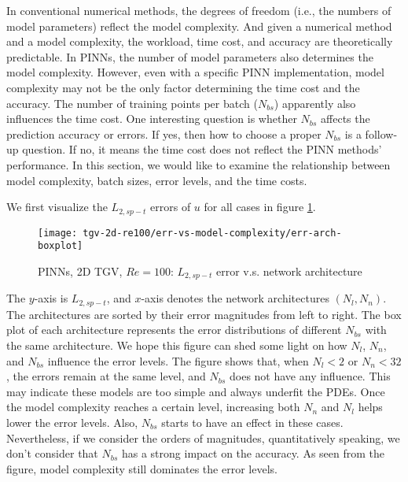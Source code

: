 
In conventional numerical methods, the degrees of freedom (i.e., the numbers of model parameters) reflect the model complexity.
And given a numerical method and a model complexity, the workload, time cost, and accuracy are theoretically predictable.
In PINNs, the number of model parameters also determines the model complexity.
However, even with a specific PINN implementation, model complexity may not be the only factor determining the time cost and the accuracy.
The number of training points per batch ($N_{bs}$) apparently also influences the time cost.
One interesting question is whether $N_{bs}$ affects the prediction accuracy or errors.
If yes, then how to choose a proper $N_{bs}$ is a follow-up question. 
If no, it means the time cost does not reflect the PINN methods' performance.
In this section, we would like to examine the relationship between model complexity, batch sizes, error levels, and the time costs.

We first visualize the $L_{2,sp-t}$ errors of $u$ for all cases in figure \ref{fig:tgv2d-re100-err-vs-arch}.
\begin{figure}[hbt!]
    \centering%
    \texttt{[image: tgv-2d-re100/err-vs-model-complexity/err-arch-boxplot]}
    \caption[%
        PINNs, 2D TGV, $Re=100$: $L_{2,sp-t}$ error v.s. network architecture%
    ]{%
        PINNs, 2D TGV, $Re=100$: $L_{2,sp-t}$ error v.s. network architecture%
    }
    \label{fig:tgv2d-re100-err-vs-arch}
\end{figure}
The $y$-axis is $L_{2,sp-t}$, and $x$-axis denotes the network architectures $(N_l, N_n)$.
The architectures are sorted by their error magnitudes from left to right.
The box plot of each architecture represents the error distributions of different $N_{bs}$ with the same architecture.
We hope this figure can shed some light on how $N_l$, $N_n$, and $N_{bs}$ influence the error levels.
The figure shows that, when $N_l < 2$ or $N_n < 32$, the errors remain at the same level, and $N_{bs}$ does not have any influence.
This may indicate these models are too simple and always underfit the PDEs.
Once the model complexity reaches a certain level, increasing both $N_n$ and $N_l$ helps lower the error levels.
Also, $N_{bs}$ starts to have an effect in these cases.
Nevertheless, if we consider the orders of magnitudes, quantitatively speaking, we don't consider that $N_{bs}$ has a strong impact on the accuracy.
As seen from the figure, model complexity still dominates the error levels. 

